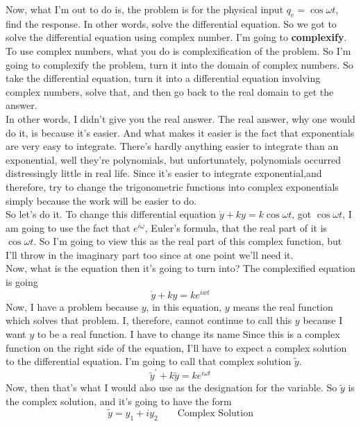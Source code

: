 Now, what I'm out to do is, the problem is for the physical input $q_e =  \cos \omega t$,
find the response. In other words, solve the differential equation.
So we got to solve the differential equation using complex number. 
I'm going to \textbf{complexify}.
To use complex numbers, what you do is complexification of the problem.
So I'm going to complexify the problem, turn it into the domain of complex numbers.
So take the differential equation, turn it into a differential equation involving
complex numbers, solve that, and then go back to the real domain to get the answer.\\

In other words, I didn't give you the real answer.
The real answer, why one would do it, is because it's easier.
And what makes it easier is the fact that exponentials are very easy to integrate.
There's hardly anything easier to integrate than an exponential, well they're polynomials,
but unfortunately, polynomials occurred distressingly little in real life.
Since it's easier to integrate exponential,and therefore, try to change the trigonometric functions
into complex exponentials simply because the work will be easier to do.\\

So let's do it.
To change this differential equation $\dot{y} + ky = k \cos \omega t$, got $\cos \omega t$, 
I am  going to use the fact that $e^{i \omega}$, Euler's formula, that the real part of it
is $\cos \omega t$.
So I'm going to view this as the real part of this complex function, but I'll
throw in the imaginary part too since at one point we'll need it.\\

Now, what is the equation then it's going to turn into?
The complexified equation is going
\begin{equation*}
  \dot{y} + ky = k e^{iwt}
\end{equation*}
Now, I have a problem because $y$, in this equation, $y$ means the real function which solves that problem.
I, therefore, cannot continue to call this $y$ because I want $y$ to be a real function.
I have to change its name Since this is a complex function on the right side of the equation,
I'll have to expect a complex solution to the differential equation.
I'm going to call that complex solution $\tilde y$.
\begin{equation*}
  \tilde y ^{\prime} + k \tilde y = k e^{i \omega t}
\end{equation*}
Now, then that's what I would also use as the designation for the variable.
So $\tilde y$  is the complex solution, and it's going to have the form
\begin{equation*}
  \tilde y = y_1 + i y_2 \qquad \text{Complex Solution}
\end{equation*}

